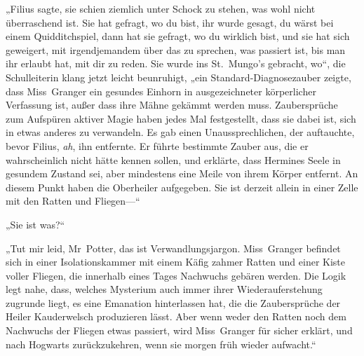 „Filius sagte, sie schien ziemlich unter Schock zu stehen, was wohl nicht überraschend ist. Sie hat gefragt, wo du bist, ihr wurde gesagt, du wärst bei einem Quidditchspiel, dann hat sie gefragt, wo du wirklich bist, und sie hat sich geweigert, mit irgendjemandem über das zu sprechen, was passiert ist, bis man ihr erlaubt hat, mit dir zu reden. Sie wurde ins St.~Mungo’s gebracht, wo“, die Schulleiterin klang jetzt leicht beunruhigt, „ein Standard-Diagnosezauber zeigte, dass Miss~Granger ein gesundes Einhorn in ausgezeichneter körperlicher Verfassung ist, außer dass ihre Mähne gekämmt werden muss. Zaubersprüche zum Aufspüren aktiver Magie haben jedes Mal festgestellt, dass sie dabei ist, sich in etwas anderes zu verwandeln.
Es gab einen Unaussprechlichen, der auftauchte, bevor Filius, \emph{ah}, ihn entfernte. Er führte bestimmte Zauber aus, die er wahrscheinlich nicht hätte kennen sollen, und erklärte, dass Hermines Seele in gesundem Zustand sei, aber mindestens eine Meile von ihrem Körper entfernt. An diesem Punkt haben die Oberheiler aufgegeben. Sie ist derzeit allein in einer Zelle mit den Ratten und Fliegen—“

„Sie ist was?“

„Tut mir leid, Mr~Potter, das ist Verwandlungsjargon. Miss~Granger befindet sich in einer Isolationskammer mit einem Käfig zahmer Ratten und einer Kiste voller Fliegen, die innerhalb eines Tages Nachwuchs gebären werden. Die Logik legt nahe, dass, welches Mysterium auch immer ihrer Wiederauferstehung zugrunde liegt, es eine Emanation hinterlassen hat, die die Zaubersprüche der Heiler Kauderwelsch produzieren lässt. Aber wenn weder den Ratten noch dem Nachwuchs der Fliegen etwas passiert, wird Miss~Granger für sicher erklärt, und nach Hogwarts zurückzukehren, wenn sie morgen früh wieder aufwacht.“

